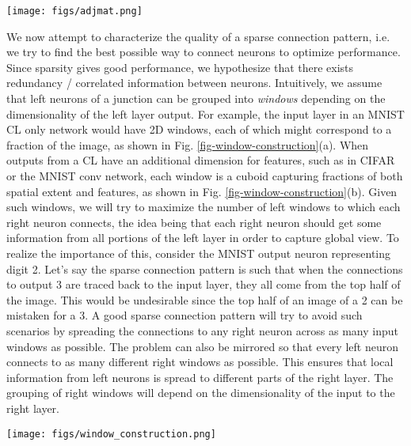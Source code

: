 \documentclass[conference]{IEEEtran}
\begin{document}
\begin{figure*}[!t]
\begin{center}
\texttt{[image: figs/adjmat.png]}
\end{center}
\caption{An example of adjacency matrices and equivalent junctions.}
\label{fig-adjmat}
\end{figure*}

We now attempt to characterize the quality of a sparse connection pattern, i.e. we try to find the best possible way to connect neurons to optimize performance. Since sparsity gives good performance, we hypothesize that there exists redundancy / correlated information between %
neurons. Intuitively, we assume that left neurons of a junction can be grouped into \emph{windows} depending on the dimensionality of the left layer output. For example, the input layer in an MNIST CL only network would have 2D windows, each of which might correspond to a fraction of the image, as shown in Fig. \ref{fig-window-construction}(a). When outputs from a CL have an additional dimension for features, such as in CIFAR or the MNIST conv network, each window is a cuboid capturing fractions of both spatial extent and features, as shown in Fig. \ref{fig-window-construction}(b). Given such windows, we will try to maximize the number of left windows to which each right neuron connects, the idea being that each right neuron should get some information from all portions of the left layer in order to capture global view. To realize the importance of this, consider the MNIST output neuron representing digit 2. Let's say the sparse connection pattern is such that when the connections to output 3 are traced back to the input layer, they all come from the top half of the image. This would be undesirable since the top half of an image of a 2 can be mistaken for a 3. A good sparse connection pattern will try to avoid such scenarios by spreading the connections to any right neuron across as many input windows as possible. The problem can also be mirrored so that every left neuron connects to as many different right windows as possible. This ensures that local information from left neurons is spread to different parts of the right layer. The grouping of right windows will depend on the dimensionality of the input to the right layer.

\begin{figure*}[!t]
\begin{center}
\texttt{[image: figs/window\_construction.png]}
\end{center}
\caption{(a) Example of 16 2D windows for an MNIST input image. (b) Example of 3D windows when the output from a layer also includes features. (c) Construction of window adjacency matrices.}
\label{fig-window-construction}
\end{figure*}
\end{document}
